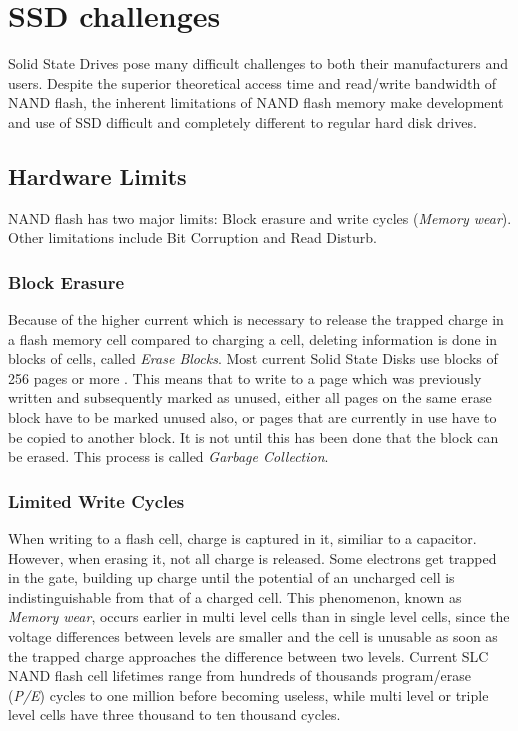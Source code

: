 \documentclass{acm_proc_article-sp}
\begin{document}
\section{SSD challenges}
Solid State Drives pose many difficult challenges to both their manufacturers and users. Despite the superior theoretical access time and read/write bandwidth of NAND flash, the inherent limitations of NAND flash memory make development and use of SSD difficult and completely different to regular hard disk drives.

\subsection{Hardware Limits}
NAND flash has two major limits: Block erasure and write cycles (\emph{Memory wear}). Other limitations include Bit Corruption and Read Disturb.

\subsubsection*{Block Erasure}
Because of the higher current which is necessary to release the trapped charge in a flash memory cell compared to charging a cell, deleting information is done in blocks of cells, called \emph{Erase Blocks}. Most current Solid State Disks use blocks of 256 pages or more \cite{codecapsule2014coding}.
This means that to write to a page which was previously written and subsequently marked as unused, either all pages on the same erase block have to be marked unused also, or pages that are currently in use have to be copied to another block. It is not until this has been done that the block can be erased. This process is called \emph{Garbage Collection}.

\subsubsection*{Limited Write Cycles}
When writing to a flash cell, charge is captured in it, similiar to a capacitor. %
However, when erasing it, not all charge is released. Some electrons get trapped in the gate, building up charge until the potential of an uncharged cell is indistinguishable from that of a charged cell. This phenomenon, known as \emph{Memory wear}, occurs earlier in multi level cells than in single level cells, since the voltage differences between levels are smaller and the cell is unusable as soon as the trapped charge approaches the difference between two levels.
Current SLC NAND flash cell lifetimes range from hundreds of thousands program/erase (\emph{P/E}) cycles to one million before becoming useless, while multi level or triple level cells have three thousand to ten thousand cycles.
\end{document}
